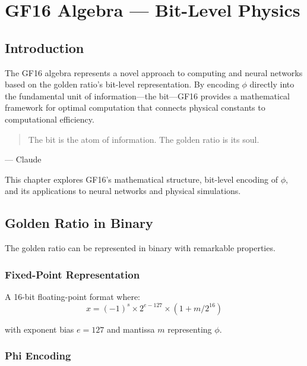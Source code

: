 \chapter{GF16 Algebra — Bit-Level Physics}
\label{ch:23}

\section{Introduction}

The GF16 algebra represents a novel approach to computing and neural networks based on the golden ratio's bit-level representation. By encoding $\phi$ directly into the fundamental unit of information—the bit—GF16 provides a mathematical framework for optimal computation that connects physical constants to computational efficiency.

\begin{quote}
The bit is the atom of information. The golden ratio is its soul.
\end{quote}
— Claude

This chapter explores GF16's mathematical structure, bit-level encoding of $\phi$, and its applications to neural networks and physical simulations.

\section{Golden Ratio in Binary}

The golden ratio can be represented in binary with remarkable properties.

\subsection{Fixed-Point Representation}

\begin{definition}[GF16 Format]
\label{def:gf16}
A 16-bit floating-point format where:
\begin{equation}
x = (-1)^s \times 2^{e-127} \times (1 + m/2^{16})
\end{equation}

with exponent bias $e = 127$ and mantissa $m$ representing $\phi$.
\end{definition}

\subsection{Phi Encoding}

